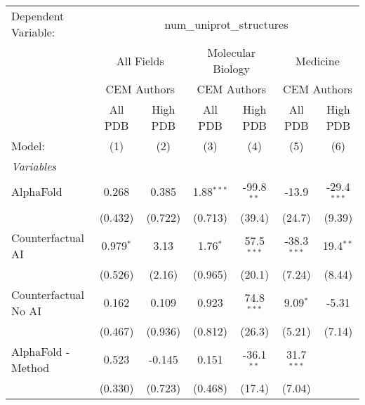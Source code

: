 \begingroup
\centering
\begin{tabular}{lcccccc}
   \tabularnewline \midrule \midrule
   Dependent Variable: & \multicolumn{6}{c}{num\_uniprot\_structures}\\
 & \multicolumn{2}{c}{All Fields} & \multicolumn{2}{c}{Molecular Biology} & \multicolumn{2}{c}{Medicine} \\
\cmidrule(lr){2-3} \cmidrule(lr){4-5} \cmidrule(lr){6-7}
 & \multicolumn{2}{c}{CEM Authors} & \multicolumn{2}{c}{CEM Authors} & \multicolumn{2}{c}{CEM Authors} \\
\cmidrule(lr){2-3} \cmidrule(lr){4-5} \cmidrule(lr){6-7}
 & \multicolumn{1}{c}{All PDB} & \multicolumn{1}{c}{High PDB} & \multicolumn{1}{c}{All PDB} & \multicolumn{1}{c}{High PDB} & \multicolumn{1}{c}{All PDB} & \multicolumn{1}{c}{High PDB} \\
\cmidrule(lr){2-2} \cmidrule(lr){3-3} \cmidrule(lr){4-4} \cmidrule(lr){5-5} \cmidrule(lr){6-6} \cmidrule(lr){7-7}
   Model:                                                     & (1)           & (2)       & (3)          & (4)          & (5)           & (6)\\  
   \midrule
   \emph{Variables}\\
   AlphaFold                                                  & 0.268         & 0.385     & 1.88$^{***}$ & -99.8$^{**}$ & -13.9         & -29.4$^{***}$\\   
                                                              & (0.432)       & (0.722)   & (0.713)      & (39.4)       & (24.7)        & (9.39)\\   
   Counterfactual AI                                          & 0.979$^{*}$   & 3.13      & 1.76$^{*}$   & 57.5$^{***}$ & -38.3$^{***}$ & 19.4$^{**}$\\   
                                                              & (0.526)       & (2.16)    & (0.965)      & (20.1)       & (7.24)        & (8.44)\\   
   Counterfactual No AI                                       & 0.162         & 0.109     & 0.923        & 74.8$^{***}$ & 9.09$^{*}$    & -5.31\\   
                                                              & (0.467)       & (0.936)   & (0.812)      & (26.3)       & (5.21)        & (7.14)\\   
   AlphaFold - Method                                         & 0.523         & -0.145    & 0.151        & -36.1$^{**}$ & 31.7$^{***}$  &   \\   
                                                              & (0.330)       & (0.723)   & (0.468)      & (17.4)       & (7.04)        &   \\   

\end{tabular}
